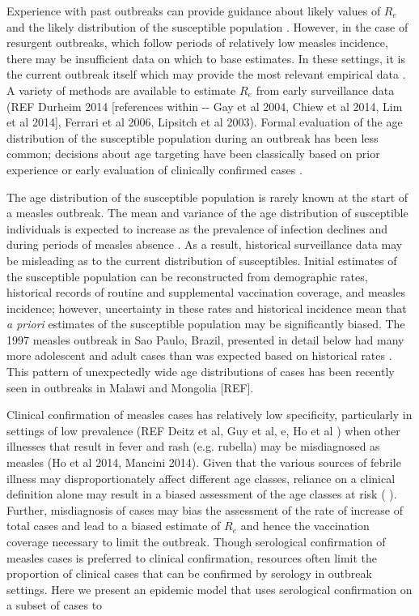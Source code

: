 Experience with past outbreaks can provide guidance about likely values
of \(R_{e}\) \cite{Durrheim_2014} and the likely distribution of the
susceptible population \cite{Goodson_2011, 25803382}. However, in
the case of resurgent outbreaks, which follow periods of relatively low
measles incidence, there may be insufficient data on which to base
estimates. In these settings, it is the current outbreak itself which
may provide the most relevant empirical data \cite{Durrheim_2014, Merl_2009, Shea_2014}. A variety of methods are available to estimate \(R_{e}\) from early surveillance data \cite{Durrheim_2014} (REF Durheim 2014 {[}references
within -\/- Gay et al 2004, Chiew et al 2014, Lim et al 2014{]}, Ferrari
et al 2006, Lipsitch et al 2003). Formal evaluation of the age
distribution of the susceptible population during an outbreak has been
less common; decisions about age targeting have been classically based
on prior experience or early evaluation of clinically confirmed cases \cite{Minetti_2013a}.

The age distribution of the susceptible population is rarely known at
the start of a measles outbreak. The mean and variance of the age
distribution of susceptible individuals is expected to increase as the
prevalence of infection declines \cite{Goodson_2011, Ferrari_2013} and
during periods of measles absence \cite{Durrheim_2014}. As a result,
historical surveillance data may be misleading as to the current
distribution of susceptibles. Initial estimates of the susceptible
population can be reconstructed from demographic rates, historical
records of routine and supplemental vaccination coverage, and measles
incidence\cite{Takahashi_2015}; however, uncertainty in these rates and historical incidence
mean that \emph{a priori} estimates of the susceptible population may be
significantly biased. The 1997 measles outbreak in Sao Paulo, Brazil,
presented in detail below had many more adolescent and adult cases than
was expected based on historical rates \cite{Camargo_2000}. This pattern of
unexpectedly wide age distributions of cases has been recently seen in
outbreaks in Malawi \cite{Minetti_2013} and Mongolia {[}REF{]}.

Clinical confirmation of measles cases has relatively low specificity,
particularly in settings of low prevalence (REF Deitz et al, Guy et al,
e\cite{Hutchins_2004}, Ho et al ) when other illnesses that result in fever and
rash (e.g. rubella) may be misdiagnosed as measles (Ho et al 2014,
Mancini 2014). Given that the various sources of febrile illness may
disproportionately affect different age classes, reliance on a clinical
definition alone may result in a biased assessment of the age classes at
risk (\cite{Hutchins_2004}\cite{Hutchins_2004} \cite{Durrheim_2014}). Further, misdiagnosis of
cases may bias the assessment of the rate of increase of total cases and
lead to a biased estimate of \(R_{e}\) and hence the vaccination
coverage necessary to limit the outbreak. Though serological
confirmation of measles cases is preferred to clinical confirmation,
resources often limit the proportion of clinical cases that can be
confirmed by serology in outbreak settings. Here we present an epidemic
model that uses serological confirmation on a subset of cases to

